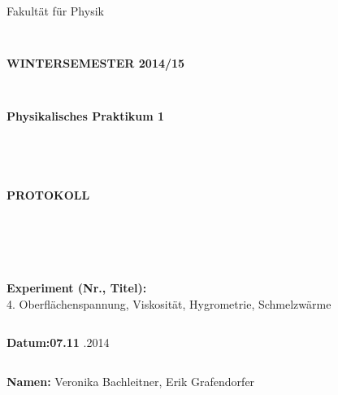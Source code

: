 \documentclass{article}
\begin{document}
\thispagestyle{empty}
			\begin{center}
			\Large{Fakultät für Physik}\\
			\end{center}
\begin{verbatim}


\end{verbatim}
			\begin{center}
			\textbf{\LARGE WINTERSEMESTER 2014/15}
			\end{center}
\begin{verbatim}


\end{verbatim}
			\begin{center}
			\textbf{\LARGE{Physikalisches Praktikum 1}}
			\end{center}
\begin{verbatim}




\end{verbatim}

			\begin{center}
			\textbf{\LARGE{PROTOKOLL}}
			\end{center}
			
\begin{verbatim}





\end{verbatim}

			\begin{flushleft}
			\textbf{\Large{Experiment (Nr., Titel):}}\\
			\LARGE{4. Oberflächenspannung, Viskosität, Hygrometrie, Schmelzwärme}	
			\end{flushleft}

\begin{verbatim}

\end{verbatim}	
			\begin{flushleft}
			\textbf{\Large{Datum:07.11}} \Large{.2014}
			\end{flushleft}
			
\begin{verbatim}
\end{verbatim}
		\begin{flushleft}
			\textbf{\Large{Namen:}} \Large{Veronika Bachleitner, Erik Grafendorfer}
			\end{flushleft}
\end{document}
